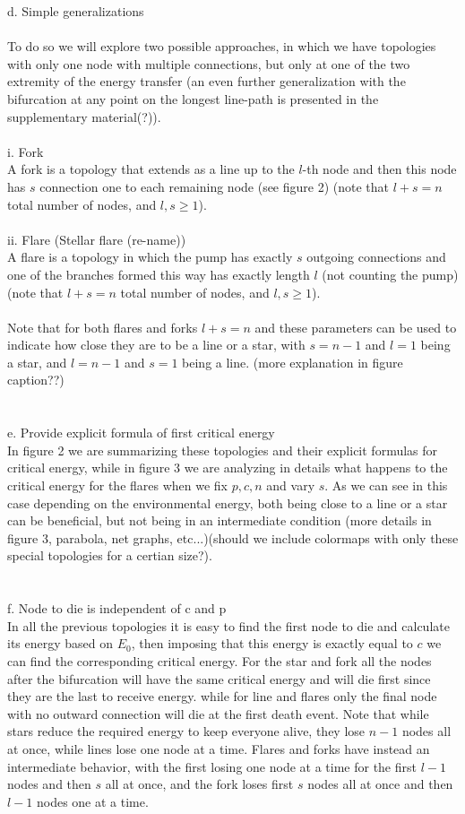 \documentclass{amsart}
\theoremstyle{plain}
\numberwithin{equation}{section}
\begin{document}
 d. Simple generalizations\\
\\To do so we will explore two possible approaches, in which we have topologies with only one node with multiple connections, but only at one of the two extremity of the energy transfer (an even further generalization with the bifurcation at any point on the longest line-path is presented in the supplementary material(?)).
\\
\\
  i. Fork\\
  A fork is a topology that extends as a line up to the $l$-th node and then this node has $s$ connection one to each remaining node (see figure 2) (note that $l+s=n$ total number of nodes, and $l,s\geq 1$).
	\\
	\\
	ii. Flare (Stellar flare (re-name))\\
	A flare is a topology in which the pump has exactly $s$ outgoing connections and one of the branches formed this way has exactly length $l$ (not counting the pump) (note that $l+s=n$ total number of nodes, and $l,s\geq 1$).\\
	\\
	Note that for both flares and forks $l+s=n$ and these parameters can be used to indicate how close they are to be a line or a star, with $s=n-1$ and $l=1$ being a star, and $l=n-1$ and $s=1$ being a line.
	(more explanation in figure caption??) 
	\\
	\\
	\\
 e. Provide explicit formula of first critical energy\\
 In figure 2 we are summarizing these topologies and their explicit formulas for critical energy, while in figure 3 we are analyzing in details what happens to the critical energy for the flares when we fix $p,c,n$ and vary $s$. As we can see in this case depending on the environmental energy, both being close to a line or a star can be beneficial, but not being in an intermediate condition (more details in figure 3, parabola, net graphs, etc...)(should we include colormaps with only these special topologies for a certian size?).
\\
\\
\\
 f. Node to die is independent of c and p\\
 In all the previous topologies it is easy to find the first node to die and calculate its energy based on $E_0$, then imposing that this energy is exactly equal to $c$ we can find the corresponding critical energy. For the star and fork all the nodes after the bifurcation will have the same critical energy and will die first since they are the last to receive energy. while for line and flares only the final node with no outward connection will die at the first death event. Note that while stars reduce the required energy to keep everyone alive, they lose $n-1$ nodes all at once, while lines lose one node at a time. Flares and forks have instead an intermediate behavior, with the first losing one node at a time for the first $l-1$ nodes and then $s$ all at once, and the fork loses first $s$ nodes all at once and then $l-1$ nodes one at a time.
\end{document}
